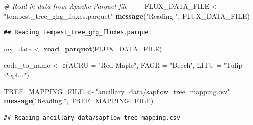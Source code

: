 \documentclass[
]{article}
\newenvironment{Shaded}{\begin{snugshade}}{\end{snugshade}}
\newcommand{\AttributeTok}[1]{\textcolor[rgb]{0.13,0.29,0.53}{#1}}
\newcommand{\CommentTok}[1]{\textcolor[rgb]{0.56,0.35,0.01}{\textit{#1}}}
\newcommand{\FunctionTok}[1]{\textcolor[rgb]{0.13,0.29,0.53}{\textbf{#1}}}
\newcommand{\NormalTok}[1]{#1}
\newcommand{\OtherTok}[1]{\textcolor[rgb]{0.56,0.35,0.01}{#1}}
\newcommand{\StringTok}[1]{\textcolor[rgb]{0.31,0.60,0.02}{#1}}
\begin{document}
\begin{Shaded}
\begin{Highlighting}[]
\CommentTok{\# Read in data from Apache Parquet file {-}{-}{-}{-}{-}}
\NormalTok{FLUX\_DATA\_FILE }\OtherTok{\textless{}{-}} \StringTok{"tempest\_tree\_ghg\_fluxes.parquet"}
\FunctionTok{message}\NormalTok{(}\StringTok{"Reading "}\NormalTok{, FLUX\_DATA\_FILE)}
\end{Highlighting}
\end{Shaded}

\begin{verbatim}
## Reading tempest_tree_ghg_fluxes.parquet
\end{verbatim}

\begin{Shaded}
\begin{Highlighting}[]
\NormalTok{my\_data }\OtherTok{\textless{}{-}} \FunctionTok{read\_parquet}\NormalTok{(FLUX\_DATA\_FILE)}

\NormalTok{code\_to\_name }\OtherTok{\textless{}{-}} \FunctionTok{c}\NormalTok{(}\AttributeTok{ACRU =} \StringTok{"Red Maple"}\NormalTok{, }\AttributeTok{FAGR =} \StringTok{"Beech"}\NormalTok{, }\AttributeTok{LITU =} \StringTok{"Tulip Poplar"}\NormalTok{)}

\NormalTok{TREE\_MAPPING\_FILE }\OtherTok{\textless{}{-}} \StringTok{"ancillary\_data/sapflow\_tree\_mapping.csv"}
\FunctionTok{message}\NormalTok{(}\StringTok{"Reading "}\NormalTok{, TREE\_MAPPING\_FILE)}
\end{Highlighting}
\end{Shaded}

\begin{verbatim}
## Reading ancillary_data/sapflow_tree_mapping.csv
\end{verbatim}
\end{document}
